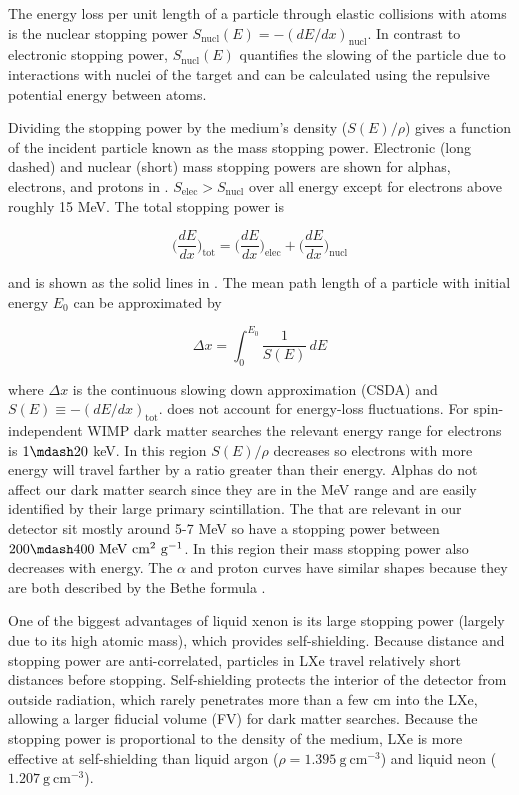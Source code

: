 The energy loss per unit length of a particle through elastic collisions with atoms is the nuclear stopping power
$S_{\mathrm{nucl}}(E) = -(dE/dx)_{\mathrm{nucl}}$.  In contrast to electronic stopping power,
$S_{\mathrm{nucl}}(E)$ quantifies the slowing of the particle due to interactions with nuclei of the target and can be calculated using
the repulsive potential energy between atoms.

Dividing the stopping power by the medium's density ($S(E) / \rho$) gives a function of the incident particle known as
the mass stopping power.  Electronic (long dashed) and nuclear (short) mass stopping powers are shown for alphas, electrons, and protons
in .  $S_{\mathrm{elec}} > S_{\mathrm{nucl}}$ over all energy except for electrons above roughly 15
MeV.  The total stopping power is

\begin{equation}
\bigg( \frac{dE}{dx} \bigg)_{\mathrm{tot}} = \bigg( \frac{dE}{dx} \bigg)_{\mathrm{elec}} + \bigg( \frac{dE}{dx} \bigg)_{\mathrm{nucl}}
\end{equation}

\noindent and is shown as the solid lines in .  The mean path length of a particle with initial energy
$E_0$ can be approximated by

\begin{equation}
\Delta x = \int_0^{E_0} \frac{1}{S(E)}\, dE
\label{eq:stopping_power_dist_trav}
\end{equation}

\noindent where $\Delta x$ is the continuous slowing down approximation (CSDA) and
$S(E) \equiv -(dE/dx)_{\mathrm{tot}}$.   does not account for energy-loss
fluctuations.  For spin-independent
WIMP dark matter searches the relevant energy range for electrons is $1 \mdash 20$ keV.  In this region $S(E)/\rho$ decreases so
electrons with more energy will travel farther by a ratio greater than their energy.  Alphas do not affect
our dark matter search since they are in the MeV range and are easily identified by their large primary scintillation.  The
\alphadecays that are relevant in our detector sit mostly around 5-7 MeV so have a stopping power between
$200 \mdash 400\ \mathrm{MeV\ cm^2\ g^{-1}}$.  In this region their mass stopping power also decreases with energy.  The $\alpha$ and
proton curves have similar shapes because they are both described by the Bethe formula .

One of the biggest advantages of liquid xenon is its large stopping power (largely due to its high atomic
mass), which provides self-shielding.  Because distance and stopping power are anti-correlated, particles in LXe travel relatively short
distances before stopping.  Self-shielding protects the interior of the detector from outside radiation,
which rarely penetrates more than a few cm
into the LXe, allowing a larger fiducial volume (FV) for dark matter searches.  Because the stopping power is proportional to the
density of the medium, LXe is more effective at self-shielding than liquid argon ($\rho = 1.395\ \mathrm{g\ cm^{-3}}$) and liquid neon
($1.207\ \mathrm{g\ cm^{-3}}$).

